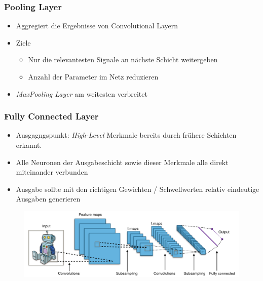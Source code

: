 \begin{frame}
\frametitle{Pooling Layer}

\begin{itemize}
\item Aggregiert die Ergebnisse von Convolutional Layern
\item Ziele
\begin{itemize}
	\item Nur die relevantesten Signale an nächste Schicht weitergeben
	\item Anzahl der Parameter im Netz reduzieren
\end{itemize}

\item \emph{MaxPooling Layer} am weitesten verbreitet
\end{itemize}



\end{frame}



\begin{frame}
\frametitle{Fully Connected Layer}

\begin{itemize}
\item Ausgagngspunkt: \emph{High-Level} Merkmale bereits durch frühere Schichten erkannt. 
\item Alle Neuronen der Ausgabeschicht sowie dieser Merkmale alle direkt miteinander verbunden
\item Ausgabe sollte mit den richtigen Gewichten / Schwellwerten relativ eindeutige Ausgaben generieren
\end{itemize}

\begin{figure}
	\includegraphics[width=.9\linewidth]{./geschichtliches/convolutionalNN/img/cnn_overview_alpha}
\end{figure}


\end{frame}


